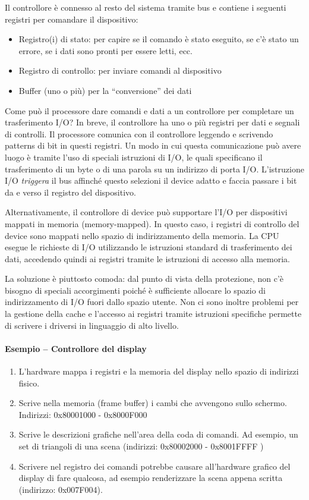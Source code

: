 \documentclass[a4paper]{article}
\begin{document}
Il controllore è connesso al resto del sistema tramite bus e contiene i seguenti registri per comandare il dispositivo:
\begin{itemize}
   \item Registro(i) di stato: per capire se il comando è stato eseguito, se c'è stato un errore, se i dati sono pronti per essere letti, ecc.
   \item Registro di controllo: per inviare comandi al dispositivo
   \item Buffer (uno o più) per la ``conversione'' dei dati
\end{itemize}

Come può il processore dare comandi e dati a un controllore per completare un trasferimento I/O? In breve, il controllore ha uno o più registri per dati e segnali di controlli. Il processore comunica con il controllore leggendo e scrivendo patterns di bit in questi registri. Un modo in cui questa comunicazione può avere luogo è tramite l'uso di speciali istruzioni di I/O, le quali specificano il trasferimento di un byte o di una parola su un indirizzo di porta I/O. L'istruzione I/O \textit{triggera} il bus affinché questo selezioni il device adatto e faccia passare i bit da e verso il registro del dispositivo.

Alternativamente, il controllore di device può supportare l'I/O per dispositivi mappati in memoria (memory-mapped). In questo caso, i registri di controllo del device sono mappati nello spazio di indirizzamento della memoria. La CPU esegue le richieste di I/O utilizzando le istruzioni standard di trasferimento dei dati, accedendo quindi ai registri tramite le istruzioni di accesso alla memoria.

La soluzione è piuttosto comoda: dal punto di vista della protezione, non c'è bisogno di speciali accorgimenti poiché è sufficiente allocare lo spazio di indirizzamento di I/O fuori dallo spazio utente. Non ci sono inoltre problemi per la gestione della cache e l'accesso ai registri tramite istruzioni specifiche permette di scrivere i driversi in linguaggio di alto livello.

\paragraph {Esempio -- Controllore del display}
\begin{enumerate}
   \item L'hardware mappa i registri e la memoria del display nello spazio di indirizzi fisico.
   \item Scrive nella memoria (frame buffer) i cambi che avvengono sullo schermo. Indirizzi: 0x80001000 - 0x8000F000
   \item Scrive le descrizioni grafiche nell'area della coda di comandi. Ad esempio, un set di triangoli di una scena (indirizzi: 0x80002000 - 0x8001FFFF )
   \item Scrivere nel registro dei comandi potrebbe causare all'hardware grafico del display di fare qualcosa, ad esempio renderizzare la scena appena scritta (indirizzo: 0x007F004).
\end{enumerate}
\end{document}
